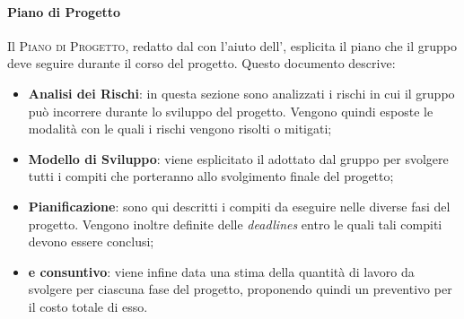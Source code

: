 \documentclass[../norme-di-progetto.tex]{subfiles}
\begin{document}
\paragraph{Piano di Progetto}
Il \textsc{Piano di Progetto}, redatto dal  con l'aiuto dell', esplicita il piano che il gruppo deve seguire durante il corso del progetto. Questo documento descrive:
\begin{itemize}
  \item \textbf{Analisi dei Rischi}: in questa sezione sono analizzati i rischi in cui il gruppo può incorrere durante lo sviluppo del progetto. Vengono quindi esposte le modalità con le quali i rischi vengono risolti o mitigati;
  \item \textbf{Modello di Sviluppo}: viene esplicitato il  adottato dal gruppo per svolgere tutti i compiti che porteranno allo svolgimento finale del progetto;
  \item \textbf{Pianificazione}: sono qui descritti i compiti da eseguire nelle diverse fasi del progetto. Vengono inoltre definite delle \textit{deadlines} entro le quali tali compiti devono essere conclusi;
  \item \textbf{ e consuntivo}: viene infine data una stima della quantità di lavoro da svolgere per ciascuna fase del progetto, proponendo quindi un preventivo per il costo totale di esso.
\end{itemize}
\end{document}
